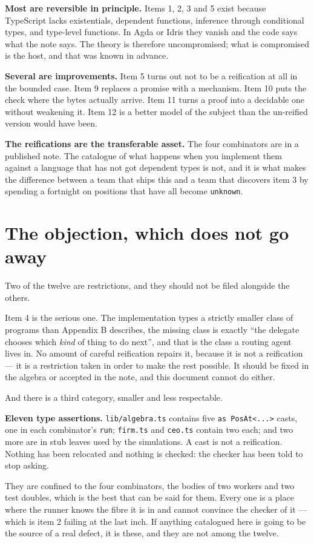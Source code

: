 \documentclass[11pt,a4paper]{article}
\begin{document}
\textbf{Most are reversible in principle.} Items 1, 2, 3 and 5 exist because
TypeScript lacks existentials, dependent functions, inference through
conditional types, and type-level functions. In Agda or Idris they vanish and
the code says what the note says. The theory is therefore uncompromised; what is
compromised is the host, and that was known in advance.

\textbf{Several are improvements.} Item 5 turns out not to be a reification at
all in the bounded case. Item 9 replaces a promise with a mechanism.
Item 10 puts the check where the bytes actually arrive. Item 11 turns a proof
into a decidable one without weakening it. Item 12 is a better model of the
subject than the un-reified version would have been.

\textbf{The reifications are the transferable asset.} The four combinators are
in a published note. The catalogue of what happens when you implement them
against a language that has not got dependent types is not, and it is what makes
the difference between a team that ships this and a team that discovers item 3
by spending a fortnight on positions that have all become \texttt{unknown}.

\section{The objection, which does not go away}

Two of the twelve are restrictions, and they should not be filed alongside the
others.

Item 4 is the serious one. The implementation types a strictly smaller class of
programs than Appendix B describes, the missing class is exactly ``the delegate
chooses which \emph{kind} of thing to do next'', and that is the class a routing
agent lives in. No amount of careful reification repairs it, because it is not a
reification --- it is a restriction taken in order to make the rest possible. It
should be fixed in the algebra or accepted in the note, and this document cannot
do either.

And there is a third category, smaller and less respectable.

\begin{alarmbox}
\textbf{Eleven type assertions.} \texttt{lib/algebra.ts} contains five
\texttt{as PosAt<...>} casts, one in each combinator's \texttt{run};
\texttt{firm.ts} and \texttt{ceo.ts} contain two each; and two more are in
stub leaves used by the simulations. A cast is not a reification. Nothing has
been relocated and nothing is checked: the checker has been told to stop asking.

They are confined to the four combinators, the bodies of two workers and two
test doubles, which is the best that can be said for them. Every one is a place
where the runner knows the fibre it is in and cannot convince the checker of it
--- which is item 2 failing at the last inch. If anything catalogued here is
going to be the source of a real defect, it is these, and they are not among
the twelve.
\end{alarmbox}
\end{document}
